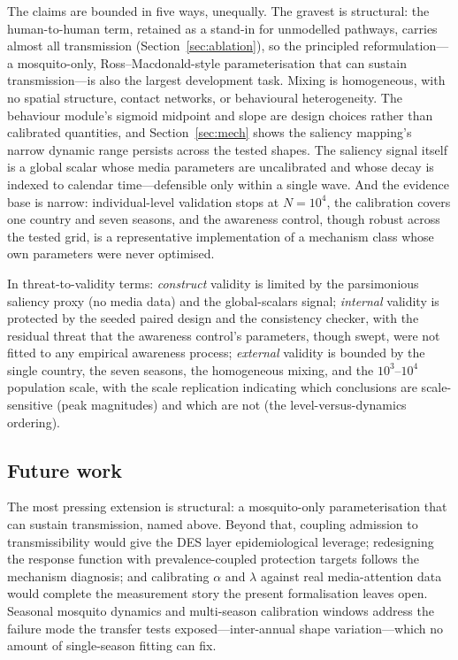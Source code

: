 \documentclass[]{interact}
\begin{document}
The claims are bounded in five ways, unequally. The gravest is structural: the human-to-human term, retained as a stand-in for unmodelled pathways, carries almost all transmission (Section~\ref{sec:ablation}), so the principled reformulation---a mosquito-only, Ross--Macdonald-style parameterisation that can sustain transmission---is also the largest development task. Mixing is homogeneous, with no spatial structure, contact networks, or behavioural heterogeneity. The behaviour module's sigmoid midpoint and slope are design choices rather than calibrated quantities, and Section~\ref{sec:mech} shows the saliency mapping's narrow dynamic range persists across the tested shapes. The saliency signal itself is a global scalar whose media parameters are uncalibrated and whose decay is indexed to calendar time---defensible only within a single wave. And the evidence base is narrow: individual-level validation stops at $N{=}10^{4}$, the calibration covers one country and seven seasons, and the awareness control, though robust across the tested grid, is a representative implementation of a mechanism class whose own parameters were never optimised.

In threat-to-validity terms: \emph{construct} validity is limited by the parsimonious saliency proxy (no media data) and the global-scalars signal; \emph{internal} validity is protected by the seeded paired design and the consistency checker, with the residual threat that the awareness control's parameters, though swept, were not fitted to any empirical awareness process; \emph{external} validity is bounded by the single country, the seven seasons, the homogeneous mixing, and the $10^{3}$--$10^{4}$ population scale, with the scale replication indicating which conclusions are scale-sensitive (peak magnitudes) and which are not (the level-versus-dynamics ordering).

\subsection{Future work}

The most pressing extension is structural: a mosquito-only parameterisation that can sustain transmission, named above. Beyond that, coupling admission to transmissibility would give the DES layer epidemiological leverage; redesigning the response function with prevalence-coupled protection targets follows the mechanism diagnosis; and calibrating $\alpha$ and $\lambda$ against real media-attention data would complete the measurement story the present formalisation leaves open. Seasonal mosquito dynamics and multi-season calibration windows address the failure mode the transfer tests exposed---inter-annual shape variation---which no amount of single-season fitting can fix.
\end{document}
